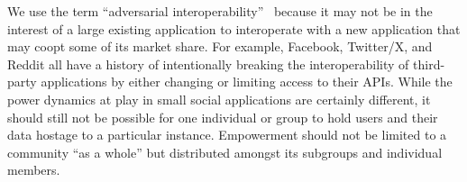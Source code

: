 
We use the term ``adversarial interoperability''~\cite{adversarialinterop} because it may not be in the
interest of a large existing application to interoperate with a new application that may coopt some of its market share.
For example, Facebook, Twitter/X, and Reddit all have a history of intentionally breaking
the interoperability of third-party applications by either changing or limiting access to their APIs.
While the power dynamics at play in small social applications are certainly
different,
it should still not be possible for one individual or group to hold users
and their data hostage to a particular instance.
Empowerment should not be limited to a community ``as a whole'' but
distributed amongst its subgroups and individual members.









